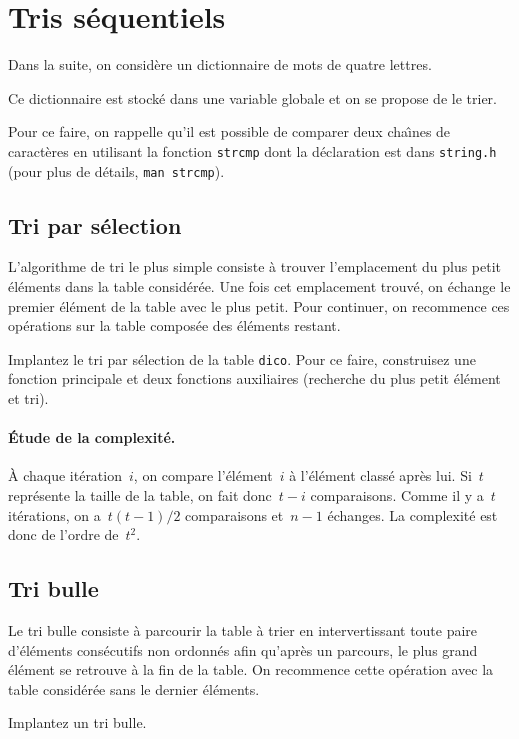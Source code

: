\section{Tris s\'equentiels}
\label{sec:TrisSequentiels}
Dans la suite, on consid\`ere un dictionnaire de mots de quatre lettres.

Ce dictionnaire  est  stock\'e dans  une  variable  globale  et on  se
propose de le trier.
\par
Pour ce faire,   on  rappelle qu'il est    possible de comparer   deux
cha\^\i{}nes de caract\`eres en  utilisant la fonction \texttt{strcmp}
dont   la  d\'eclaration  est   dans   \texttt{string.h} (pour plus   de
d\'etails, \texttt{man strcmp}).
\subsection{Tri par s\'election}
\label{sec:TriSelection}
L'algorithme de tri le  plus simple consiste \`a trouver l'emplacement
du plus petit \'el\'ements dans  la table consid\'er\'ee. Une fois cet
emplacement trouv\'e, on \'echange le  premier \'el\'ement de la table
avec le plus petit. Pour continuer, on recommence ces op\'erations sur
la table compos\'ee des \'el\'ements restant.
\begin{exercice}
  Implantez le tri par s\'election de la  table \texttt{dico}. Pour ce
  faire,  construisez une    fonction principale   et deux   fonctions
  auxiliaires (recherche du plus petit \'el\'ement et tri).%
  \ifcorrection
  \begin{correction}
    
  \end{correction}
  \fi
\paragraph{\'Etude de la complexit\'e.}
\`A  chaque it\'eration~$i$,     on compare  l'\'el\'ement~$i$     \`a
l'\'el\'ement class\'e apr\`es lui.  Si~$t$  repr\'esente la taille de
la  table, on fait     donc~${t-i}$ comparaisons.  Comme  il  y  a~$t$
it\'erations, on a~${t(t-1)/2}$ comparaisons et~${n-1}$ \'echanges. La
complexit\'e est donc de l'ordre de~$t^{2}$.
\end{exercice}
\subsection{Tri bulle}
\label{sec:TriBulle}
\begin{exercice}
  Le  tri  bulle  consiste \`a     parcourir  la table  \`a trier   en
  intervertissant   toute   paire  d'\'el\'ements   cons\'ecutifs  non
  ordonn\'es afin qu'apr\`es un parcours, le plus grand \'el\'ement se
  retrouve \`a la  fin de la   table. On recommence cette  op\'eration
  avec la table consid\'er\'ee sans le dernier \'el\'ements.
  \par
  Implantez un tri bulle.%
  \ifcorrection
  \begin{correction}
    
  \end{correction}
  \fi
\end{exercice}
